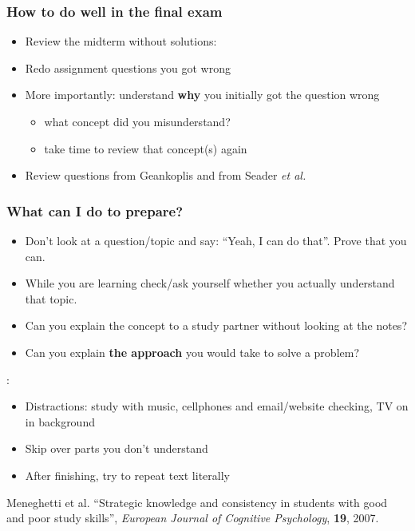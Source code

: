 \begin{frame}\frametitle{How to do well in the final exam}
	\begin{itemize}
		\item	Review the midterm without solutions: \emph{{\color{myOrange}{it should be easy now}}}
		\item	Redo assignment questions you got wrong
		\item	More importantly: understand \textbf{why} you initially got the question wrong
			\begin{itemize}
				\item	what concept did you misunderstand?
				\item	take time to review that concept(s) again
			\end{itemize}
		\item	Review questions from Geankoplis and from Seader \emph{et al.}
	\end{itemize}
\end{frame}

\begin{frame}\frametitle{What can I do to prepare?}
	\textbf{{}}
	\begin{itemize}
		\item	Don't look at a question/topic and say: ``Yeah, I can do that''. Prove that you can.
		\item	While you are learning check/ask yourself whether you actually understand that topic.
		\item	Can you explain the concept to a study partner without looking at the notes?
		\item	Can you explain \textbf{the approach} you would take to solve a problem?
	\end{itemize}
	\textbf{{\color{myRed}{Poor students do this*}}}:
	\begin{itemize}
		\item	Distractions: study with music, cellphones and email/website checking, TV on in background
		\item	Skip over parts you don't understand
		\item	After finishing, try to repeat text literally
	\end{itemize}
	\textbf{{\color{myRed}{*}}}{\tiny Meneghetti et al. ``Strategic knowledge and consistency in students with good and poor study skills'', \emph{European Journal of Cognitive Psychology}, \textbf{19}, 2007.}
\end{frame}

